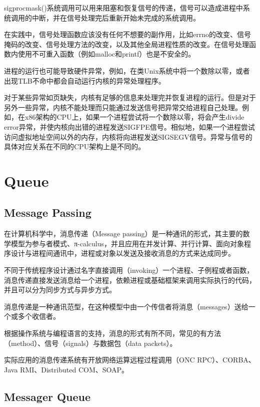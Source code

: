 sigprocmask()系统调用可以用来阻塞和恢复信号的传递，信号可以造成进程中系统调用的中断，并在信号处理完后重新开始未完成的系统调用。

在实践中，信号处理函数应该没有任何不想要的副作用，比如errno的改变、信号掩码的改变、信号处理方法的改变，以及其他全局进程性质的改变。在信号处理函数内使用不可重入函数（例如malloc和printf）也是不安全的。

进程的运行也可能导致硬件异常，例如，在类Unix系统中将一个数除以零，或者出现TLB不命中都会自动运行内核的异常处理程序。

对于某些异常如页缺失，内核有足够的信息来处理完并恢复进程的运行。但是对于另外一些异常，内核不能处理而只能通过发送信号把异常交给进程自己处理。例如，在x86架构的CPU上，如果一个进程尝试将一个数除以零，将会产生divide error异常，并使内核向出错的进程发送SIGFPE信号。相似地，如果一个进程尝试访问虚拟地址空间以外的内存，内核将向进程发送SIGSEGV信号。异常与信号的具体对应关系在不同的CPU架构上是不同的。



\section{Queue}


\subsection{Message Passing}

在计算机科学中，消息传递（Message passing）是一种通讯的形式，其主要的数学模型为参与者模式、π-calculus，并且应用在并发计算、并行计算、面向对象程序设计与进程间通讯中，进程或对象以发送及接收消息的方式来达成同步。

不同于传统程序设计通过名字直接调用（invoking）一个进程、子例程或者函数，消息传递直接发送消息给一个进程，依赖进程或基础框架来调用实际执行的代码，并且可以分为同步方式与异步方式。

消息传递是一种通讯范型，在这种模型中由一个传信者将消息（messages）送给一个或多个收信者。

根据操作系统与编程语言的支持，消息的形式有所不同，常见的有方法（method）、信号（signals）与数据包（data packets）。

实际应用的消息传递系统有开放网络运算远程过程调用（ONC RPC）、CORBA、Java RMI、Distributed COM、SOAP。



\subsection{Messager Queue}


